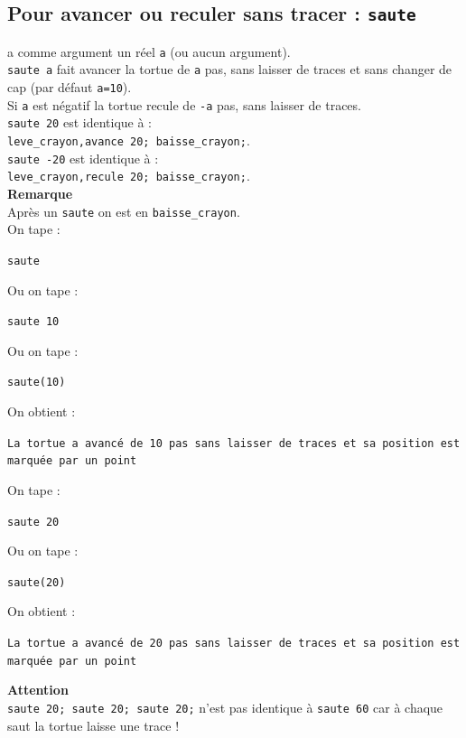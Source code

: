 \documentclass[a4paper,11pt]{book}
\begin{document}
\subsection{Pour avancer ou reculer sans tracer : {\tt saute}}
 a comme argument un r\'eel {\tt a} (ou aucun argument).\\
{\tt saute a} fait avancer la tortue de {\tt a} pas, sans laisser de traces et 
sans changer de cap (par d\'efaut {\tt a=10}).\\
Si {\tt a} est n\'egatif la tortue recule de {\tt -a} pas, sans laisser de 
traces.\\
{\tt saute 20} est identique \`a  :\\
{\tt leve\_crayon,avance 20; baisse\_crayon;}.\\
{\tt saute -20} est identique \`a  :\\
{\tt leve\_crayon,recule 20; baisse\_crayon;}.\\
{\bf Remarque} \\
Apr\`es un {\tt saute} on est en {\tt baisse\_crayon}.\\
On tape :
\begin{center}{\tt saute}\end{center}
Ou on tape :
\begin{center}{\tt saute 10}\end{center}
Ou on tape :
\begin{center}{\tt saute(10)}\end{center}
On obtient :
\begin{center}{\tt La tortue a avanc\'e de 10 pas sans laisser de traces et sa position est marqu\'ee par un point}\end{center}
On tape :
\begin{center}{\tt saute 20}\end{center}
Ou on tape :
\begin{center}{\tt saute(20)}\end{center}
On obtient :
\begin{center}{\tt La tortue a avanc\'e de 20 pas sans laisser de traces et sa position est marqu\'ee par un point}\end{center}
{\bf Attention}\\
{\tt saute 20; saute 20; saute 20;} n'est pas identique \`a {\tt saute 60} car
\`a chaque saut la tortue laisse une trace !
\end{document}
